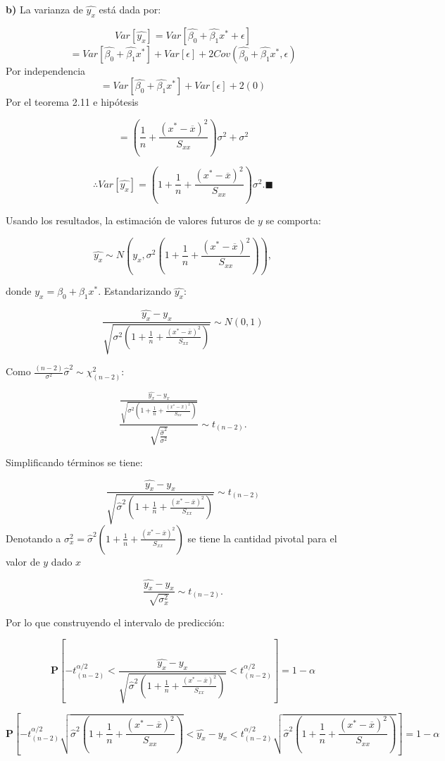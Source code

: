 \documentclass[a4paper,oneside,openany]{book}
\begin{document}
\textbf{b)} La varianza de \(\hat{y_{x}}\) está dada por:

\[Var\left[\hat{y_{x}}\right]=Var\left[\hat{\beta_{0}}+\hat{\beta_{1}}x^*+\epsilon\right]\]
\[=Var\left[\hat{\beta_{0}}+\hat{\beta_{1}}x^*\right]+Var\left[\epsilon\right]+2Cov(\hat{\beta_{0}}+\hat{\beta_{1}}x^*,\epsilon)\]
Por independencia
\[=Var\left[\hat{\beta_{0}}+\hat{\beta_{1}}x^*\right]+Var\left[\epsilon\right]+2(0)\]
Por el teorema 2.11 e hipótesis

\[=\left(\frac{1}{n}+\frac{(x^*-\overline{x})^2}{S_{xx}}\right)\sigma^2+\sigma^2\]

\[\therefore Var\left[\hat{y_{x}}\right]=\left(1+ \frac{1}{n}+\frac{(x^*-\overline{x})^2}{S_{xx}}\right)\sigma^2. \blacksquare\]

Usando los resultados, la estimación de valores futuros de \(y\) se
comporta:

\[\hat{y_{x}} \sim N \left(y_{x},\sigma^2\left(1+ \frac{1}{n}+\frac{(x^*-\overline{x})^2}{S_{xx}}\right)\right),\]

donde \(y_{x}=\beta_{0}+\beta_{1}x^*.\) Estandarizando \(\hat{y_{x}}:\)

\[\frac{\hat{y_{x}}-y_{x}}{\sqrt{\sigma^2\left(1+ \frac{1}{n}+\frac{(x^*-\overline{x})^2}{S_{xx}}\right)}}\sim N (0,1)\]

Como \(\frac{(n-2)}{\sigma^2}\hat{\sigma}^2 \sim \chi^2_{(n-2)}\):

\[\frac{\frac{\hat{y_{x}}-y_{x}}{\sqrt{\sigma^2\left(1+ \frac{1}{n}+\frac{(x^*-\overline{x})^2}{S_{xx}}\right)}}}{\sqrt{\frac{\hat{\sigma}^2}{\sigma^2}}}\sim t_{(n-2)}.\]

Simplificando términos se tiene:

\[\frac{\hat{y_{x}}-y_{x}}{\sqrt{\hat{\sigma}^2\left(1+ \frac{1}{n}+\frac{(x^*-\overline{x})^2}{S_{xx}}\right)}}\sim t_{(n-2)}\]
Denotando a
\(\sigma^2_{x}=\hat{\sigma}^2\left(1+ \frac{1}{n}+\frac{(x^*-\overline{x})^2}{S_{xx}}\right)\)
se tiene la cantidad pivotal para el valor de \(y\) dado \(x\)

\[\frac{\hat{y_{x}}-y_{x}}{\sqrt{\sigma_{x}^2}}\sim t_{(n-2)}.\]

Por lo que construyendo el intervalo de predicción:

\[\mathbf{P}\left[-t^{\alpha/2}_{(n-2)}<\frac{\hat{y_{x}}-y_{x}}{\sqrt{\hat{\sigma}^2\left(1+ \frac{1}{n}+\frac{(x^*-\overline{x})^2}{S_{xx}}\right)}}<t^{\alpha/2}_{(n-2)}\right]=1-\alpha\]

\[\mathbf{P}\left[-t^{\alpha/2}_{(n-2)}\sqrt{\hat{\sigma}^2\left(1+ \frac{1}{n}+\frac{(x^*-\overline{x})^2}{S_{xx}}\right)}<\hat{y_{x}}-y_{x}<t^{\alpha/2}_{(n-2)}\sqrt{\hat{\sigma}^2\left(1+ \frac{1}{n}+\frac{(x^*-\overline{x})^2}{S_{xx}}\right)}\right]=1-\alpha\]
\end{document}

